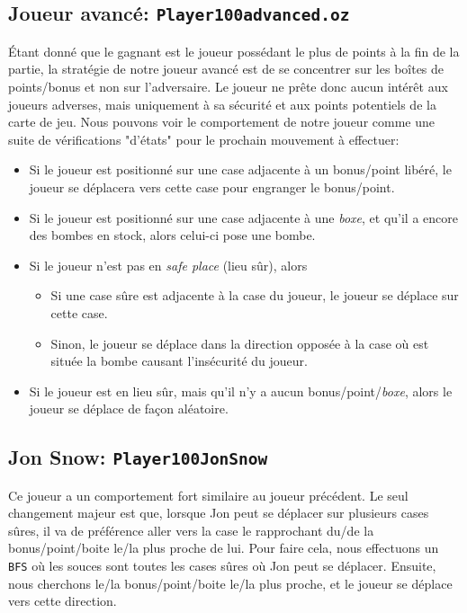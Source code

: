 \documentclass{article}
\begin{document}
\subsection{Joueur avancé: \texttt{Player100advanced.oz}}
Étant donné que le gagnant est le joueur possédant le plus de points à la fin de la partie, la stratégie de notre joueur avancé est de se concentrer sur les boîtes de points/bonus et non sur l'adversaire. Le joueur ne prête donc aucun intérêt aux joueurs adverses, mais uniquement à sa sécurité et aux points potentiels de la carte de jeu. Nous pouvons voir le comportement de notre joueur comme une suite de vérifications "d'états" pour le prochain mouvement à effectuer:
\begin{itemize}
	\item Si le joueur est positionné sur une case adjacente à un bonus/point libéré, le joueur se déplacera vers cette case pour engranger le bonus/point.
	\item Si le joueur est positionné sur une case adjacente à une \emph{boxe}, et qu'il a encore des bombes en stock, alors celui-ci pose une bombe.
	\item Si le joueur n'est pas en \emph{safe place} (lieu sûr), alors
		\begin{itemize}
			\item Si une case sûre est adjacente à la case du joueur, le joueur se déplace sur cette case.
			\item Sinon, le joueur se déplace dans la direction opposée à la case où est située la bombe causant l'insécurité du joueur.
		\end{itemize}
	\item Si le joueur est en lieu sûr, mais qu'il n'y a aucun bonus/point/\emph{boxe}, alors le joueur se déplace de façon aléatoire.
\end{itemize}
\subsection{Jon Snow: \texttt{Player100JonSnow}}
Ce joueur a un comportement fort similaire au joueur précédent. Le seul changement majeur est que, lorsque Jon peut se déplacer sur plusieurs cases sûres, il va de préférence aller vers la case le rapprochant du/de la bonus/point/boite le/la plus proche de lui. Pour faire cela, nous effectuons un \texttt{BFS} où les souces sont toutes les cases sûres où Jon peut se déplacer. Ensuite, nous cherchons le/la bonus/point/boite le/la plus proche, et le joueur se déplace vers cette direction.
\end{document}
